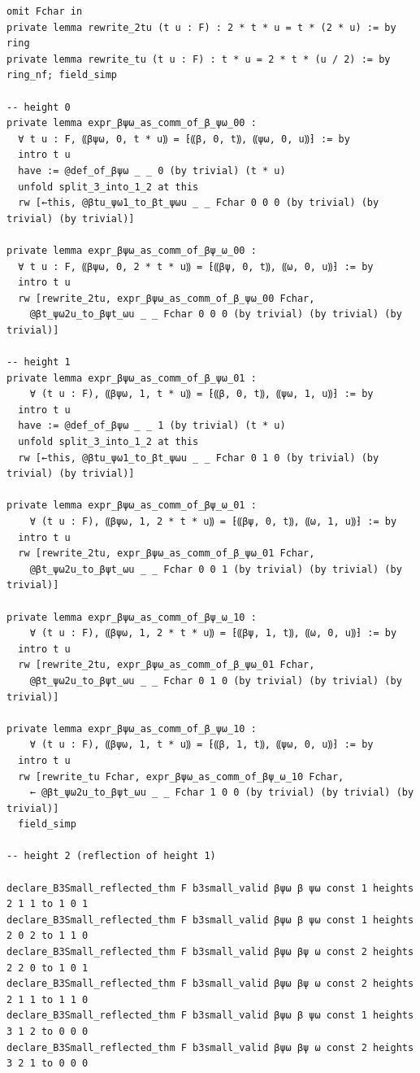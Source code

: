\begin{Verbatim}
omit Fchar in
private lemma rewrite_2tu (t u : F) : 2 * t * u = t * (2 * u) := by ring
private lemma rewrite_tu (t u : F) : t * u = 2 * t * (u / 2) := by ring_nf; field_simp

-- height 0
private lemma expr_βψω_as_comm_of_β_ψω_00 :
  ∀ t u : F, ⸨βψω, 0, t * u⸩ = ⁅⸨β, 0, t⸩, ⸨ψω, 0, u⸩⁆ := by
  intro t u
  have := @def_of_βψω _ _ 0 (by trivial) (t * u)
  unfold split_3_into_1_2 at this
  rw [←this, @βtu_ψω1_to_βt_ψωu _ _ Fchar 0 0 0 (by trivial) (by trivial) (by trivial)]

private lemma expr_βψω_as_comm_of_βψ_ω_00 :
  ∀ t u : F, ⸨βψω, 0, 2 * t * u⸩ = ⁅⸨βψ, 0, t⸩, ⸨ω, 0, u⸩⁆ := by
  intro t u
  rw [rewrite_2tu, expr_βψω_as_comm_of_β_ψω_00 Fchar,
    @βt_ψω2u_to_βψt_ωu _ _ Fchar 0 0 0 (by trivial) (by trivial) (by trivial)]

-- height 1
private lemma expr_βψω_as_comm_of_β_ψω_01 :
    ∀ (t u : F), ⸨βψω, 1, t * u⸩ = ⁅⸨β, 0, t⸩, ⸨ψω, 1, u⸩⁆ := by
  intro t u
  have := @def_of_βψω _ _ 1 (by trivial) (t * u)
  unfold split_3_into_1_2 at this
  rw [←this, @βtu_ψω1_to_βt_ψωu _ _ Fchar 0 1 0 (by trivial) (by trivial) (by trivial)]

private lemma expr_βψω_as_comm_of_βψ_ω_01 :
    ∀ (t u : F), ⸨βψω, 1, 2 * t * u⸩ = ⁅⸨βψ, 0, t⸩, ⸨ω, 1, u⸩⁆ := by
  intro t u
  rw [rewrite_2tu, expr_βψω_as_comm_of_β_ψω_01 Fchar,
    @βt_ψω2u_to_βψt_ωu _ _ Fchar 0 0 1 (by trivial) (by trivial) (by trivial)]

private lemma expr_βψω_as_comm_of_βψ_ω_10 :
    ∀ (t u : F), ⸨βψω, 1, 2 * t * u⸩ = ⁅⸨βψ, 1, t⸩, ⸨ω, 0, u⸩⁆ := by
  intro t u
  rw [rewrite_2tu, expr_βψω_as_comm_of_β_ψω_01 Fchar,
    @βt_ψω2u_to_βψt_ωu _ _ Fchar 0 1 0 (by trivial) (by trivial) (by trivial)]

private lemma expr_βψω_as_comm_of_β_ψω_10 :
    ∀ (t u : F), ⸨βψω, 1, t * u⸩ = ⁅⸨β, 1, t⸩, ⸨ψω, 0, u⸩⁆ := by
  intro t u
  rw [rewrite_tu Fchar, expr_βψω_as_comm_of_βψ_ω_10 Fchar,
    ← @βt_ψω2u_to_βψt_ωu _ _ Fchar 1 0 0 (by trivial) (by trivial) (by trivial)]
  field_simp

-- height 2 (reflection of height 1)

declare_B3Small_reflected_thm F b3small_valid βψω β ψω const 1 heights 2 1 1 to 1 0 1
declare_B3Small_reflected_thm F b3small_valid βψω β ψω const 1 heights 2 0 2 to 1 1 0
declare_B3Small_reflected_thm F b3small_valid βψω βψ ω const 2 heights 2 2 0 to 1 0 1
declare_B3Small_reflected_thm F b3small_valid βψω βψ ω const 2 heights 2 1 1 to 1 1 0
declare_B3Small_reflected_thm F b3small_valid βψω β ψω const 1 heights 3 1 2 to 0 0 0
declare_B3Small_reflected_thm F b3small_valid βψω βψ ω const 2 heights 3 2 1 to 0 0 0


\end{Verbatim}
